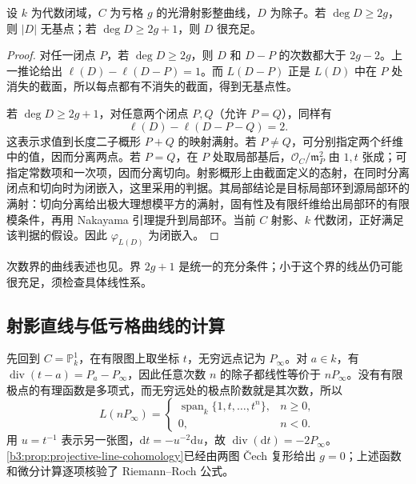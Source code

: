 \begin{proposition}\label{b3:prop:H-high-degree-linear-systems}
	设 \(k\) 为代数闭域，\(C\) 为亏格 \(g\) 的光滑射影整曲线，\(D\) 为除子。若 \(\deg D\ge2g\)，则 \(|D|\) 无基点；若 \(\deg D\ge2g+1\)，则 \(D\) 很充足。
\end{proposition}
\begin{proof}
	对任一闭点 \(P\)，若 \(\deg D\ge2g\)，则 \(D\) 和 \(D-P\) 的次数都大于 \(2g-2\)。上一推论给出 \(\ell(D)-\ell(D-P)=1\)。而 \(L(D-P)\) 正是 \(L(D)\) 中在 \(P\) 处消失的截面，所以每点都有不消失的截面，得到无基点性。

	若 \(\deg D\ge2g+1\)，对任意两个闭点 \(P,Q\)（允许 \(P=Q\)），同样有
	\[
		\ell(D)-\ell(D-P-Q)=2.
	\]
	这表示求值到长度二子概形 \(P+Q\) 的映射满射。若 \(P\ne Q\)，可分别指定两个纤维中的值，因而分离两点。若 \(P=Q\)，在 \(P\) 处取局部基后，\(\mathcal O_C/\mathfrak m_P^2\) 由 \(1,t\) 张成；可指定常数项和一次项，因而分离切向。射影概形上由截面定义的态射，在同时分离闭点和切向时为闭嵌入，这里采用\cite[Chapter II, Proposition 7.3, pp. 152--153]{Hartshorne1977}的判据。其局部结论是目标局部环到源局部环的满射：切向分离给出极大理想模平方的满射，固有性及有限纤维给出局部环的有限模条件，再用 Nakayama 引理提升到局部环。当前 \(C\) 射影、\(k\) 代数闭，正好满足该判据的假设。因此 \(\varphi_{L(D)}\) 为闭嵌入。
\end{proof}

次数界的曲线表述也见\cite[Chapter IV, Proposition 3.1 and Corollary 3.2, pp. 307--308]{Hartshorne1977}。界 \(2g+1\) 是统一的充分条件；小于这个界的线丛仍可能很充足，须检查具体线性系。

\subsection{射影直线与低亏格曲线的计算}
\label{b3:subsec:H02:02}

先回到 \(C=\mathbb P_k^1\)，在有限图上取坐标 \(t\)，无穷远点记为 \(P_\infty\)。对 \(a\in k\)，有 \(\operatorname{div}(t-a)=P_a-P_\infty\)，因此任意次数 \(n\) 的除子都线性等价于 \(nP_\infty\)。没有有限极点的有理函数是多项式，而无穷远处的极点阶数就是其次数，所以
\[
	L(nP_\infty)=
	\begin{cases}
		\operatorname{span}_k\{1,t,\ldots,t^n\},&n\ge0,\\
		0,&n<0.
	\end{cases}
\]
用 \(u=t^{-1}\) 表示另一张图，\(\mathrm{d}t=-u^{-2}\mathrm{d}u\)，故 \(\operatorname{div}(\mathrm{d}t)=-2P_\infty\)。\cref{b3:prop:projective-line-cohomology}已经由两图 Čech 复形给出 \(g=0\)；上述函数和微分计算逐项核验了 Riemann–Roch 公式。

